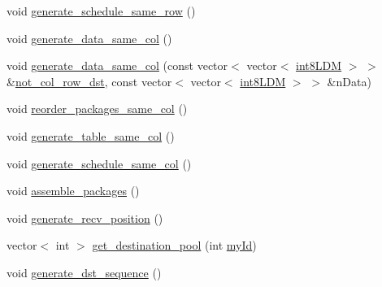\begin{DoxyCompactItemize}
\item 
void \mbox{\hyperlink{classRlmpiInitializer_a2e01c4b0ff789de3d50df5b7ead1e86d}{generate\+\_\+schedule\+\_\+same\+\_\+row}} ()
\item 
void \mbox{\hyperlink{classRlmpiInitializer_aa88c272b5b57d3ec44bbe183048e89b4}{generate\+\_\+data\+\_\+same\+\_\+col}} ()
\item 
void \mbox{\hyperlink{classRlmpiInitializer_a68f0277b57d6a61af97846cd9e100ddc}{generate\+\_\+data\+\_\+same\+\_\+col}} (const vector$<$ vector$<$ \mbox{\hyperlink{include_2RlmpiShared_8h_a69782ffde89d45e86308f10afedf08a6}{int8\+L\+DM}} $>$ $>$ \&\mbox{\hyperlink{classRlmpiInitializer_afb1edb3cd0884d3057dc3b6e89a9c6cb}{not\+\_\+col\+\_\+row\+\_\+dst}}, const vector$<$ vector$<$ \mbox{\hyperlink{include_2RlmpiShared_8h_a69782ffde89d45e86308f10afedf08a6}{int8\+L\+DM}} $>$ $>$ \&n\+Data)
\item 
void \mbox{\hyperlink{classRlmpiInitializer_a41a594eb50f4f0e3b44a0a28eb0af396}{reorder\+\_\+packages\+\_\+same\+\_\+col}} ()
\item 
void \mbox{\hyperlink{classRlmpiInitializer_aacafe4bfcbd2d27b6c63904ac431c966}{generate\+\_\+table\+\_\+same\+\_\+col}} ()
\item 
void \mbox{\hyperlink{classRlmpiInitializer_a9ae8fa3507bc5d2bee236e2320ae9ce1}{generate\+\_\+schedule\+\_\+same\+\_\+col}} ()
\item 
void \mbox{\hyperlink{classRlmpiInitializer_a03d8fdd916121bf1e703408abaf00492}{assemble\+\_\+packages}} ()
\item 
void \mbox{\hyperlink{classRlmpiInitializer_a6940fb6f728fcdb644d52787082b582f}{generate\+\_\+recv\+\_\+position}} ()
\item 
vector$<$ int $>$ \mbox{\hyperlink{classRlmpiInitializer_a1ce96c82b067ef1f1af1afeca286e0f6}{get\+\_\+destination\+\_\+pool}} (int \mbox{\hyperlink{test_2directSegment_2directSegmentIterator__slave_8c_aeaf12029768109487cb0540ba258af5a}{my\+Id}})
\item 
void \mbox{\hyperlink{classRlmpiInitializer_a50e9169843eaa848e5bff8ec3859a990}{generate\+\_\+dst\+\_\+sequence}} ()
\end{DoxyCompactItemize}
